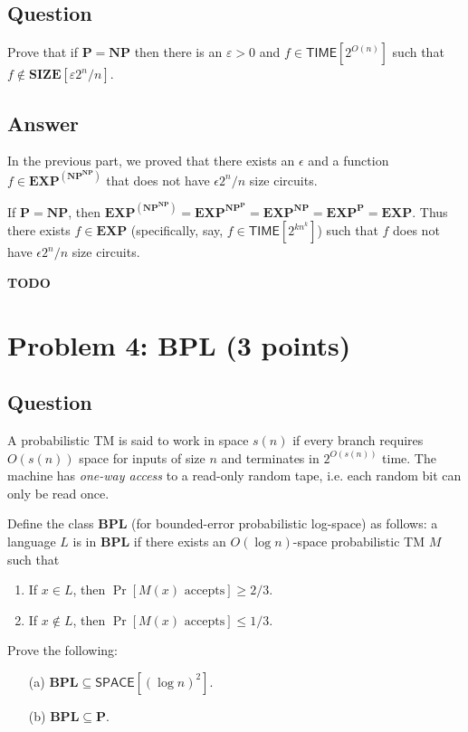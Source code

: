 \documentclass{article}
\renewcommand{\P}{\mathbf{P}}
\newcommand{\NP}{\mathbf{NP}}
\newcommand{\EXP}{\mathbf{EXP}}
\newcommand{\TIME}{\mathbf{TIME}}
\newcommand{\SIZE}{\mathbf{SIZE}}
\def \SPACE{{\mathsf{SPACE}}}
\def \TIME{{\mathsf{TIME}}}
\def \BPL{{\mathbf{BPL}}}
\begin{document}
\subsection*{Question}
Prove that if $\P = \NP$ then there is an $\varepsilon > 0$ and $f \in \TIME[2^{O(n)}]$ such that $f \notin \SIZE[\varepsilon 2^n/n]$. 

\subsection*{Answer}

In the previous part, we proved that there exists an $\epsilon$ and a function $f \in \EXP^{(\NP^{\NP})}$ that does not have $\epsilon 2^n/n$ size circuits.

If $\P = \NP$, then $\EXP^{(\NP^{\NP})} = \EXP^{\NP^\P} = \EXP^{\NP} = \EXP^\P = \EXP$.  Thus there exists $f \in \EXP$ (specifically, say, $f \in \textsf{TIME}[2^{kn^k}]$) such that $f$ does not have $\epsilon 2^n/n$ size circuits.

\textbf{TODO}


\newpage
\section*{Problem 4: BPL (3 points)}

\subsection*{Question}
A probabilistic TM is said to work in space $s(n)$ if every branch requires $O(s(n))$ space for inputs of size $n$ and terminates in $2^{O(s(n))}$ time. The machine has \emph{one-way access} to a read-only random tape, i.e. each random bit can only be read once.

Define the class $\BPL$ (for bounded-error probabilistic log-space) as follows: a language $L$ is in $\BPL$ if there exists an $O(\log n)$-space probabilistic TM $M$ such that 
\begin{enumerate}
    \item If $x\in L$, then $\Pr[M(x)\text{ accepts}]\ge 2/3$.
    \item If $x\not\in L$, then $\Pr[M(x)\text{ accepts}]\le 1/3$.
\end{enumerate}
Prove the following:
\begin{enumerate}
    \item[(a)] $\BPL\subseteq \SPACE[(\log n)^2]$.
    \item[(b)] $\BPL\subseteq \P$.
\end{enumerate}
\end{document}
